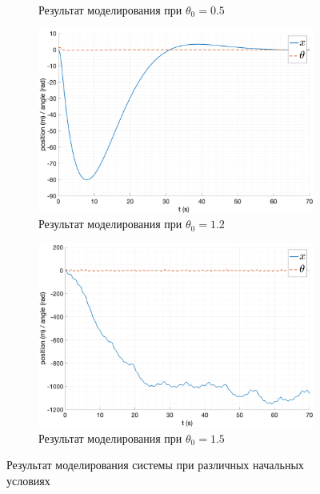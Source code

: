 \begin{figure}[ht!]
\begin{subfigure}[b]{0.45\textwidth}
        \caption{Результат моделирования при $\theta_0 = 0.5$}
    \end{subfigure}
    \begin{subfigure}[b]{0.45\textwidth}
        \centering
        \includegraphics[width=\textwidth]{media/plots/LQR/out_4.png}
        \caption{Результат моделирования при $\theta_0 = 1.2$}
    \end{subfigure}
    \begin{subfigure}[b]{0.45\textwidth}
        \centering
        \includegraphics[width=\textwidth]{media/plots/LQR/out_5.png}
        \caption{Результат моделирования при $\theta_0 = 1.5$}
    \end{subfigure}
    \caption{Результат моделирования системы при различных начальных условиях}
    \label{fig:lqr_controller_2}
\end{figure}
